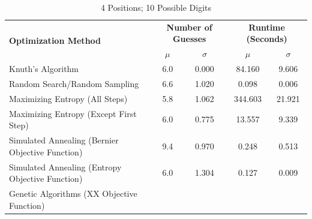 \documentclass[11pt]{article}
\begin{document}
\newpage

\begin{table}[h!]
\begin{center}
\begin{tabular}{l c c c c}
\toprule
\multirow{2}{*}{\bfseries Optimization Method} 		& \multicolumn{2}{c}{\bfseries Number of Guesses} 		& \multicolumn{2}{c}{\bfseries Runtime (Seconds)}	\\
\cmidrule(lr){2-3}  \cmidrule(lr){4-5}				& $\mu$ & $\sigma$								& $\mu$ & $\sigma$							\\
\cmidrule(lr){1-5}
Knuth's Algorithm							& 6.0 & 0.000									& 84.160 & 9.606							\\
Random Search/Random Sampling				& 6.6 & 1.020									& 0.098 & 0.006							\\
Maximizing Entropy (All Steps)					& 5.8 & 1.062									& 344.603 & 21.921							\\
Maximizing Entropy (Except First Step)			& 6.0 & 0.775									& 13.557 & 9.339							\\
Simulated Annealing (Bernier Objective Function)	& 9.4 & 0.970									& 0.248 & 0.513							\\
Simulated Annealing (Entropy Objective Function)	& 6.0 & 1.304									& 0.127 & 0.009							\\
Genetic Algorithms (XX Objective Function)		& &											& &										\\
\bottomrule
\end{tabular}
\end{center}
\caption{4 Positions; 10 Possible Digits}
\label{fig:compare_4_10}
\end{table}

\newpage

\nocite{runarsson2010adapting}
\nocite{merelo2010finding}
\nocite{doerr2013playing}
\nocite{merelo2013improving}
\nocite{snydermastermind}
\nocite{neuwirth1982some}
\nocite{kooi2005yet}

 

\end{document}
